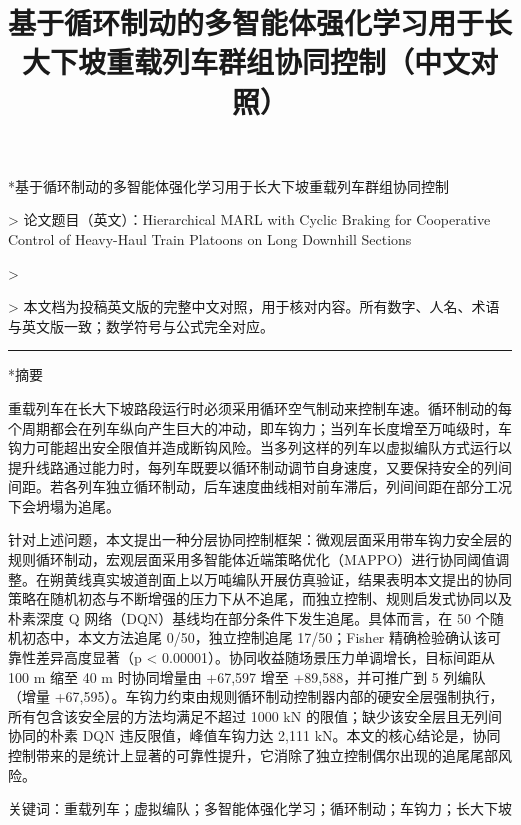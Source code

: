 \documentclass[11pt]{article}
\title{基于循环制动的多智能体强化学习用于长大下坡重载列车群组协同控制（中文对照）}
\author{}
\date{}
\makeatletter
\renewcommand{\section}{\@startsection{section}{1}{\z@}{-3.5ex \@plus -1ex \@minus -.2ex}{2.3ex \@plus .2ex}{\normalfont\large\bfseries\sffamily}}
\makeatother
\begin{document}
\maketitle

\section*{基于循环制动的多智能体强化学习用于长大下坡重载列车群组协同控制}


> 论文题目（英文）：Hierarchical MARL with Cyclic Braking for Cooperative Control of Heavy-Haul Train Platoons on Long Downhill Sections

>

> 本文档为投稿英文版的完整中文对照，用于核对内容。所有数字、人名、术语与英文版一致；数学符号与公式完全对应。



\bigskip\hrule\bigskip


\section*{摘要}


重载列车在长大下坡路段运行时必须采用循环空气制动来控制车速。循环制动的每个周期都会在列车纵向产生巨大的冲动，即车钩力；当列车长度增至万吨级时，车钩力可能超出安全限值并造成断钩风险。当多列这样的列车以虚拟编队方式运行以提升线路通过能力时，每列车既要以循环制动调节自身速度，又要保持安全的列间间距。若各列车独立循环制动，后车速度曲线相对前车滞后，列间间距在部分工况下会坍塌为追尾。



针对上述问题，本文提出一种分层协同控制框架：微观层面采用带车钩力安全层的规则循环制动，宏观层面采用多智能体近端策略优化（MAPPO）进行协同阈值调整。在朔黄线真实坡道剖面上以万吨编队开展仿真验证，结果表明本文提出的协同策略在随机初态与不断增强的压力下从不追尾，而独立控制、规则启发式协同以及朴素深度 Q 网络（DQN）基线均在部分条件下发生追尾。具体而言，在 50 个随机初态中，本文方法追尾 0/50，独立控制追尾 17/50；Fisher 精确检验确认该可靠性差异高度显著（p < 0.00001）。协同收益随场景压力单调增长，目标间距从 100 m 缩至 40 m 时协同增量由 +67,597 增至 +89,588，并可推广到 5 列编队（增量 +67,595）。车钩力约束由规则循环制动控制器内部的硬安全层强制执行，所有包含该安全层的方法均满足不超过 1000 kN 的限值；缺少该安全层且无列间协同的朴素 DQN 违反限值，峰值车钩力达 2,111 kN。本文的核心结论是，协同控制带来的是统计上显著的可靠性提升，它消除了独立控制偶尔出现的追尾尾部风险。



关键词：重载列车；虚拟编队；多智能体强化学习；循环制动；车钩力；长大下坡
\end{document}
